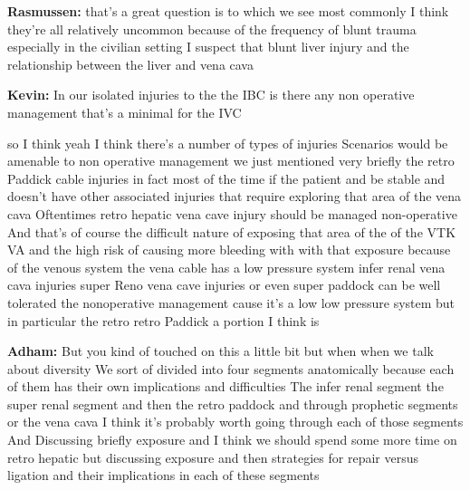 \documentclass[
]{book}
\begin{document}
\textbf{Rasmussen:} that's a great question is to which we see most commonly I think they're all relatively uncommon because of the frequency of blunt trauma especially in the civilian setting I suspect that blunt liver injury and the relationship between the liver and vena cava

\textbf{Kevin:} In our isolated injuries to the the IBC is there any non operative management that's a minimal for the IVC

so I think yeah I think there's a number of types of injuries Scenarios would be amenable to non operative management we just mentioned very briefly the retro Paddick cable injuries in fact most of the time if the patient and be stable and doesn't have other associated injuries that require exploring that area of the vena cava Oftentimes retro hepatic vena cave injury should be managed non-operative And that's of course the difficult nature of exposing that area of the of the VTK VA and the high risk of causing more bleeding with with that exposure because of the venous system the vena cable has a low pressure system infer renal vena cava injuries super Reno vena cave injuries or even super paddock can be well tolerated the nonoperative management cause it's a low low pressure system but in particular the retro retro Paddick a portion I think is

\textbf{Adham:} But you kind of touched on this a little bit but when when we talk about diversity We sort of divided into four segments anatomically because each of them has their own implications and difficulties The infer renal segment the super renal segment and then the retro paddock and through prophetic segments or the vena cava I think it's probably worth going through each of those segments And Discussing briefly exposure and I think we should spend some more time on retro hepatic but discussing exposure and then strategies for repair versus ligation and their implications in each of these segments
\end{document}
